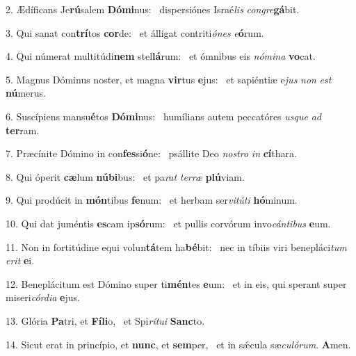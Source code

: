 2. Ædíficans Je\textbf{rú}salem \textbf{Dó}\textbf{mi}nus: \ast\  dispersiónes Israé\textit{lis} \textit{con}\textit{gre}\textbf{gá}bit.\

3. Qui sanat con\textbf{trí}tos \textbf{cor}de: \ast\  et álligat contriti\textit{ó}\textit{nes} \textit{e}\textbf{ó}rum.\

4. Qui númerat multitúdi\textbf{nem} stel\textbf{lá}rum: \ast\  et ómnibus eis \textit{nó}\textit{mi}\textit{na} \textbf{vo}cat.\

5. Magnus Dóminus noster, et magna \textbf{vir}tus \textbf{e}jus: \ast\  et sapiéntiæ e\textit{jus} \textit{non} \textit{est} \textbf{nú}merus.\

6. Suscípiens mansu\textbf{é}tos \textbf{Dó}\textbf{mi}nus: \ast\  humílians autem peccatóres \textit{us}\textit{que} \textit{ad} \textbf{ter}ram.\

7. Præcínite Dómino in con\textbf{fes}si\textbf{ó}ne: \ast\  psállite Deo \textit{nos}\textit{tro} \textit{in} \textbf{cí}thara.\

8. Qui óperit \textbf{cæ}lum \textbf{nú}\textbf{bi}bus: \ast\  et pa\textit{rat} \textit{ter}\textit{ræ} \textbf{plú}viam.\

9. Qui prodúcit in \textbf{món}tibus \textbf{fe}num: \ast\  et herbam ser\textit{vi}\textit{tú}\textit{ti} \textbf{hó}minum.\

10. Qui dat juméntis \textbf{es}cam ip\textbf{só}rum: \ast\  et pullis corvórum invo\textit{cán}\textit{ti}\textit{bus} \textbf{e}um.\

11. Non in fortitúdine equi volun\textbf{tá}tem ha\textbf{bé}bit: \ast\  nec in tíbiis viri benepláci\textit{tum} \textit{e}\textit{rit} \textbf{e}i.\

12. Beneplácitum est Dómino super ti\textbf{mén}tes \textbf{e}um: \ast\  et in eis, qui sperant super miseri\textit{cór}\textit{di}\textit{a} \textbf{e}jus.\

13. Glória \textbf{Pa}tri, et \textbf{Fí}\textbf{li}o, \ast\  et Spi\textit{rí}\textit{tu}\textit{i} \textbf{Sanc}to.\

14. Sicut erat in princípio, et \textbf{nunc}, et \textbf{sem}per, \ast\  et in sǽcula sæ\textit{cu}\textit{ló}\textit{rum}. \textbf{A}men.\

